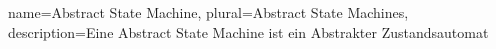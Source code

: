 
{
	name={Abstract State Machine}, %
	plural={Abstract State Machines}, %
	description={Eine Abstract State Machine ist ein Abstrakter Zustandsautomat} %
}


